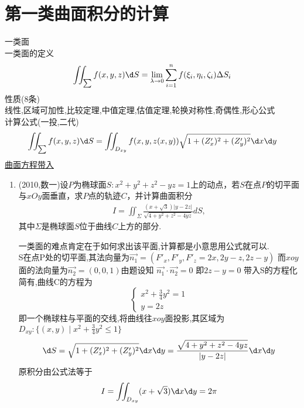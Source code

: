 \documentclass[12pt, a4paper, oneside, UTF8]{ctexbook}
\begin{document}
\section{第一类曲面积分的计算}
\begin{remark}
    一类面 \\
    一类面的定义 
    $$
    \iint_{\sum}f(x,y,z)\d S=\lim_{\lambda\to 0}\sum_{i=1}^{n}f(\xi_i,\eta_i,\zeta_i)\Delta S_i
    $$
    性质(8条) \\
    线性,区域可加性,比较定理,中值定理,估值定理,轮换对称性,奇偶性,形心公式 \\
    计算公式(一投,二代) 
    $$
    \iint_{\sum}f(x,y,z)\d S=\iint_{D_{xy}}f(x,y,z(x,y))\sqrt{1+(Z'_x)^2+(Z'_y)^2}\d x\d y 
    $$
    \underline{曲面方程带入}
\end{remark}
\begin{enumerate}[label=\arabic*.,start=7]
    \item (2010,数一)设$P$为椭球面$S:x^2+y^2+z^2-yz=1$上的动点，若$S$在点$P$的切平面与$xOy$面垂直，求$P$点的轨迹$C$，并计算曲面积分
    \begin{align*}
    I=\iint_{\Sigma}\frac{(x+\sqrt{3})|y-2z|}{\sqrt{4+y^2+z^2-4yz}}dS,
    \end{align*}
    其中$\Sigma$是椭球面$S$位于曲线$C$上方的部分.
    
    \begin{solution}
    一类面的难点肯定在于如何求出该平面,计算都是小意思用公式就可以. \\
    S在点P处的切平面,其法向量为$\vec{n_1}=(F'_x,F'_y,F'_z=2x,2y-z,2z-y)$ 而$xoy$面的法向量为$\vec{n_2}=(0,0,1)$由题设知
    $\vec{n_1}\cdot\vec{n_2}=0$ 即$2z-y=0$ 带入S的方程化简有,曲线C的方程为
    $$
        \begin{cases}
            x^2+\frac{3}{4}y^2 = 1 \\
            y = 2z
        \end{cases}
    $$
    即一个椭球柱与平面的交线,将曲线往$xoy$面投影,其区域为$D_{xy}:\{(x,y)\mid x^2+\frac{3}{4}y^2 \leq 1\}$ 
    $$
    \d S = \sqrt{1+(Z'_x)^2+(Z'_y)^2}\d x\d y = \frac{\sqrt{4+y^2+z^2-4yz}}{\left|y-2z\right|}\d x\d y
    $$
    原积分由公式法等于 
    \begin{align*}
        I = \iint_{D_{xy}} (x+\sqrt{3})\d x\d y = 2\pi
    \end{align*}
    \end{solution}
\end{enumerate}
\end{document}

